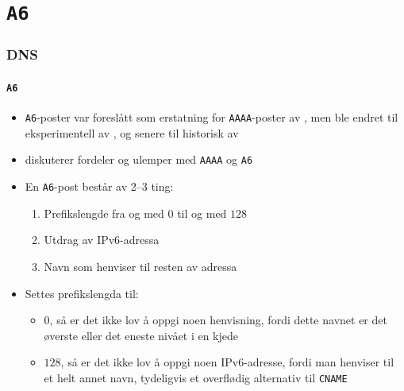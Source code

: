 \section{\texttt{A6}}
\begin{frame}%
  \frametitle{DNS}
  \framesubtitle{\texttt{A6}}
  \pause
  \begin{itemize}[<+->]
  \item \texttt{A6}-poster var foreslått som erstatning for
    \texttt{AAAA}-poster av , men ble endret til
    eksperimentell av , og senere til historisk av
  \item {} diskuterer fordeler og ulemper med \texttt{AAAA} og
    \texttt{A6}
  \item En \texttt{A6}-post består av 2--3 ting:
    \begin{enumerate}[<+->]
    \item Prefikslengde fra og med \(0\) til og med \(128\)
    \item Utdrag av IPv6-adressa
    \item Navn som henviser til resten av adressa
    \end{enumerate}
  \item Settes prefikslengda til:
    \begin{itemize}[<+->]
    \item \(0\), så er det \alert{ikke} lov å oppgi noen henvisning,
      fordi dette navnet er det øverste eller det eneste nivået i en
      kjede
    \item \(128\), så er det \alert{ikke} lov å oppgi noen IPv6-adresse,
      fordi man henviser til et helt annet navn, tydeligvis et
      overflødig alternativ til \texttt{CNAME}
    \end{itemize}
  \end{itemize}
\end{frame}

